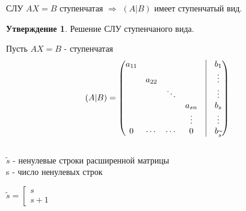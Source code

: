 \documentclass[a4paper, 12pt]{article}
\theoremstyle{definition}
\newtheorem*{subtheorem}{Утверждение}
\begin{document}
  СЛУ $AX=B$ ступенчатая $\Longrightarrow $ $(A|B)$ имеет ступенчатый вид. 
  \newpage

  \begin{subtheorem}
    Решение СЛУ ступенчаного вида.
  \end{subtheorem}  
  Пусть $AX=B$ - ступенчатая
  $$(A|B)=\begin{pmatrix}
    a_{11} & \null & \null & \null & \vline & b_1 \\
    \null & a_{22} & \null & \null & \vline & \vdots \\
    \null & \null & \ddots & \null & \vline & \vdots \\
    \null & \null & \null & a_{sn} & \vline & b_s \\
    \null & \null & \null & \vdots & \vline & \vdots \\
    0 & \cdots & \cdots & 0 & \vline & b_{\widetilde{s}}
  \end{pmatrix}$$ \\
  $\widetilde{s}$ - ненулевые строки расширенной матрицы \\
  s - число ненулевых строк 

  $\widetilde{s}=\left[
    \begin{gathered}
      s \\
      s+1
    \end{gathered}
  \right.$
\end{document}
